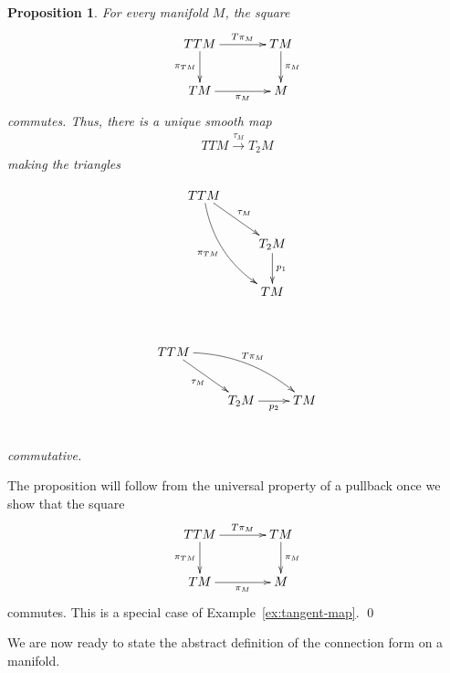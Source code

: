 \documentclass[11pt,a4paper,twoside,openany]{report}
\theoremstyle{my-theorem}
\newtheorem{proposition}[theorem]{Proposition}
\theoremstyle{non-theorem}
\renewenvironment{proof}[1][\proofname]{{\scshape #1. }}{\qed}
\begin{document}
			\begin{proposition}
				\label{prop:finsler-pullback}
				For every manifold $M$, the square
				\begin{align*}
					\xymatrixcolsep{3pc}\xymatrix{
						TTM \ar[d]_-{\pi_{TM}} \ar[r]^-{T\pi_M} & TM \ar[d]^-{\pi_M}\\
						TM \ar[r]_-{\pi_M} & M}
				\end{align*}
				commutes. Thus, there is a unique smooth map
				\begin{align*}
					TTM \xrightarrow{\tau_M} T_2M
				\end{align*}
				making the triangles\\
				\begin{minipage}{0.45\textwidth}
					\begin{align*}
						\xymatrix{
							TTM \ar@/_1pc/[rdd]_-{\pi_{TM}} \ar[rd]^-{\tau_M} &\\
							& T_2M \ar[d]^-{p_1}\\
							& TM
						}
					\end{align*}
				\end{minipage}
				~
				\begin{minipage}{0.45\textwidth}
					\begin{align*}
						\xymatrix{
							TTM \ar[rd]_-{\tau_M} \ar@/^1pc/[rrd]^-{T\pi_M} & &\\
							& T_2M \ar[r]_-{p_2} & TM
						}
					\end{align*}
				\end{minipage}\\
				commutative.
			\end{proposition}
		
			\begin{proof}
				The proposition will follow from the universal property of a pullback once we show that the square
				\begin{align*}
					\xymatrixcolsep{3pc}\xymatrix{
						TTM \ar[d]_-{\pi_{TM}} \ar[r]^-{T\pi_M} & TM \ar[d]^-{\pi_M}\\
						TM \ar[r]_-{\pi_M} & M}
				\end{align*}
				commutes. This is a special case of Example~\ref{ex:tangent-map}.
			\end{proof}
		
			We are now ready to state the abstract definition of the connection form on a manifold.
			
\end{document}

